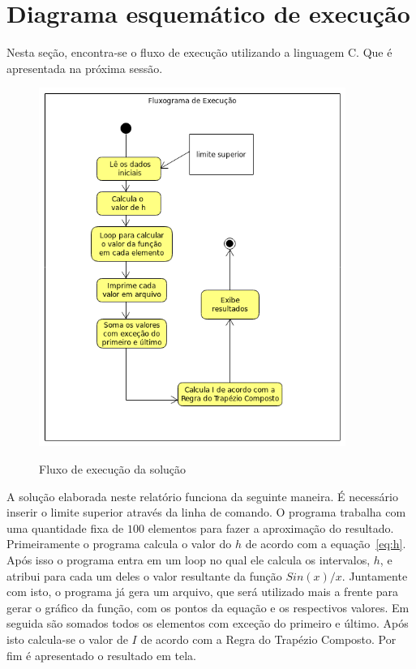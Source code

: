 \documentclass[12pt, hidelinks]{article}
\begin{document}

\newpage
\section{Diagrama esquemático de execução}
Nesta seção, encontra-se o fluxo de execução utilizando a linguagem C. Que é apresentada na próxima sessão.
\begin{figure}[!h]
  \centering
  \includegraphics[width=10cm]{figuras/fluxograma.png}\\
  \caption{Fluxo de execução da solução}\label{fig:fluxo}
\end{figure}
A solução elaborada neste relatório funciona da seguinte maneira. É necessário inserir o limite superior através da linha de comando. O programa trabalha com uma quantidade fixa de $100$ elementos para fazer a aproximação do resultado.
Primeiramente o programa calcula o valor do $h$ de acordo com a equação~\eqref{eq:h}. Após isso o programa entra em um loop no qual ele calcula os intervalos, $h$, e atribui para cada um deles o valor resultante da função $Sin(x)/x$. Juntamente com isto, o programa já gera um arquivo, que será utilizado mais a frente para gerar o gráfico da função, com os pontos da equação e os respectivos valores. Em seguida são somados todos os elementos com exceção do primeiro e último. Após isto calcula-se o valor de $I$ de acordo com a Regra do Trapézio Composto. Por fim é apresentado o resultado em tela.
\end{document}
